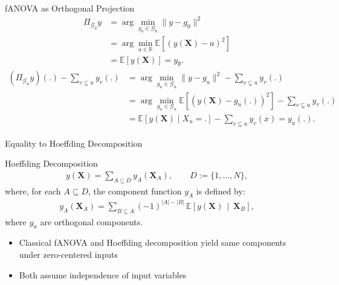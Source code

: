 \begin{frame}{fANOVA as Orthogonal Projection} %
  \begin{align*}
    \Pi_{\mathcal{G}_0}y
    &= \arg \min_{g_0 \in \mathcal{G}_0} \|y - g_0\|^2 \\ 
    &= \arg \min_{a \in \mathbb{R}} \mathbb{E}[(y(\boldsymbol{X}) - a)^2] \\ 
    &= \mathbb{E}[y(\boldsymbol{X})] = y_{\emptyset}.
\end{align*}
  \begin{align*}
    (\Pi_{\mathcal{G}_u}y)(.) - \sum_{v \subsetneq u} y_v(.)
    &= \arg \min_{g_u \in \mathcal{G}_u} \|y - g_u\|^2 - \sum_{v \subsetneq u} y_v(.)\\
    &= \arg \min_{g_u \in \mathcal{G}_{u}} \mathbb{E}[(y(\boldsymbol{X}) - g_u(.))^2] - \sum_{v \subsetneq u} y_v(.)\\
    &= \mathbb{E}[y(\boldsymbol{X}) \mid X_{u} = .] - \sum_{v \subsetneq u} y_v(x) = y_u(.).
\end{align*}
  
\end{frame}


\begin{frame}{Equality to Hoeffding Decomposition} %
  \begin{block}{Hoeffding Decomposition}
    \begin{align}
    y(\boldsymbol{X})
=
\sum_{A \subseteq D} 
y_A(\boldsymbol{X}_A),
\qquad
D := \{1,\dots,N\},
\end{align}
where, for each $A \subseteq D$, the component function $y_A$ is defined by:
\begin{align}\label{eq:hoeffding_components}
    y_A(\boldsymbol{X}_A)
=
\sum_{B \subseteq A}
(-1)^{|A|-|B|}
\,\mathbb{E}\!\left[
  y(\boldsymbol{X}) 
  \,\middle|\, 
  \boldsymbol{X}_B
\right],
\end{align}
  where $y_u$ are orthogonal components.
  \end{block}
  \begin{itemize}
    \item Classical fANOVA and Hoeffding decomposition yield same components under zero-centered inputs
    \item Both assume independence of input variables
  \end{itemize}
  
\end{frame}


